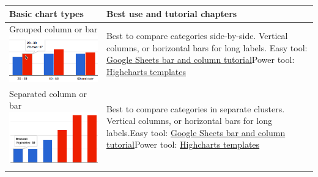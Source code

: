 \documentclass[
  english,
]{book}
\begin{document}
\begin{longtable}[]{@{}ll@{}}
\toprule
\begin{minipage}[b]{0.47\columnwidth}\raggedright
Basic chart types\strut
\end{minipage} & \begin{minipage}[b]{0.47\columnwidth}\raggedright
Best use and tutorial chapters\strut
\end{minipage}\tabularnewline
\midrule
\endhead
\begin{minipage}[t]{0.47\columnwidth}\raggedright
Grouped column or bar \includegraphics{images/05-chart/chart-grouped-column.png}\strut
\end{minipage} & \begin{minipage}[t]{0.47\columnwidth}\raggedright
Best to compare categories side-by-side. Vertical columns, or horizontal bars for long labels. Easy tool: \href{column-bar-google}{Google Sheets bar and column tutorial}Power tool: \href{highcharts}{Highcharts templates}\strut
\end{minipage}\tabularnewline
\begin{minipage}[t]{0.47\columnwidth}\raggedright
Separated column or bar \includegraphics{images/05-chart/chart-separated-column.png}\strut
\end{minipage} & \begin{minipage}[t]{0.47\columnwidth}\raggedright
Best to compare categories in separate clusters. Vertical columns, or horizontal bars for long labels.Easy tool: \href{column-bar-google}{Google Sheets bar and column tutorial}Power tool: \href{highcharts}{Highcharts templates}\strut
\end{minipage}\tabularnewline
\begin{minipage}[t]{0.47\columnwidth}\raggedright

\end{minipage}
\end{longtable}
\end{document}
